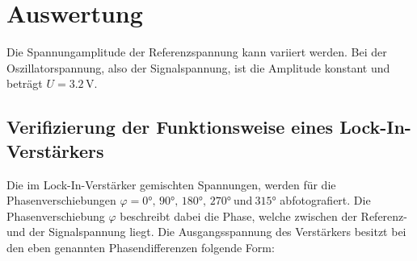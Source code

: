 


\section{Auswertung}
\label{sec:Auswertung}

Die Spannungamplitude der Referenzspannung kann variiert werden. Bei der Oszillatorspannung, also der Signalspannung, 
ist die Amplitude konstant und beträgt $U=3.2 \, \unit{\volt}$.\\

\subsection{Verifizierung der Funktionsweise eines Lock-In-Verstärkers}

Die im Lock-In-Verstärker gemischten Spannungen, werden für die Phasenverschiebungen 
$\varphi= 0°,\, 90°,\, 180°,\, 270° \ \text{und} \ 315°$ abfotografiert. Die Phasenverschiebung $\varphi$ beschreibt dabei die 
Phase, welche zwischen der Referenz- und der Signalspannung liegt. Die Ausgangsspannung des Verstärkers besitzt bei den eben genannten Phasendifferenzen 
folgende Form:

